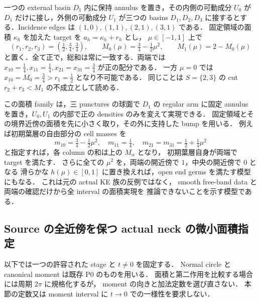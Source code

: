 \begin{example}[両端の面積配分だけでは足りない]
\label{ng8:interior-area-cut-obstruction}
一つの external basin $D_1$ 内に保持 annulus を置き，その内側の可動成分
$U_0$ が $D_1$ だけに接し，外側の可動成分 $U_1$ が三つの basins
$D_1,D_2,D_3$ に接するとする．Incidence edges は
$(1,0),(1,1),(2,1),(3,1)$ である．
固定領域の面積 $\kappa_h$ を加えた target を $a_h=\kappa_h+r_h$ とし，
$\mu\in[-1,1]$ 上で
\[
 (r_1,r_2,r_3)=\left(\tfrac12,\tfrac34,\tfrac34\right),\qquad
 M_0(\mu)=\tfrac34-\tfrac12\mu^2,\qquad M_1(\mu)=2-M_0(\mu)
\]
と置く．全て正で，総和は常に一致する．両端では
$x_{10}=\tfrac14,x_{11}=\tfrac14,x_{21}=x_{31}=\tfrac34$ が正の配分である．
一方 $\mu=0$ では $x_{10}=M_0=\tfrac34>r_1=\tfrac12$ となり不可能である．
同じことは $S=\{2,3\}$ の cut
$r_2+r_3<M_1$ の不成立として読める．

この面積 family は，三 punctures の球面で $D_1$ の regular arm に固定 annulus
を置き，$U_0,U_1$ の内部で正の densities のみを変えて実現できる．
固定領域とその境界近傍の面積を先に小さく取り，その外に支持した bump を用いる．
例えば初期葉層の自由部分の cell masses を
\[
 m_{10}=\tfrac34-\tfrac12\mu^2,\quad m_{11}=\tfrac14,\quad
 m_{21}=m_{31}=\tfrac12+\tfrac14\mu^2
\]
と指定すれば，各 column の和は上の $M_\alpha$ となり，
初期葉層自身が両端で target を満たす．
さらに全ての $\mu^2$ を，両端の開近傍で $1$，中央の開近傍で $0$ となる
滑らかな $h(\mu)\in[0,1]$ に置き換えれば，open end germs を満たす模型にもなる．
これは元の actual KE 族の反例ではなく，
smooth free-band data と両端の確認だけから全 interval の面積実現を
推論できないことを示す模型である．
\end{example}


\subsection{Source の全近傍を保つ actual neck の微小面積指定}

以下では一つの許容された stage と $t\ne0$ を固定する．
Normal circle と canonical moment は既存 P0 のものを用いる．
面積と第二作用を比較する場合には周期 $2\pi$ に規格化するが，
moment の向きと加法定数を選び直さない．
本節の定数又は moment interval に $t\to0$ での一様性を要求しない．

